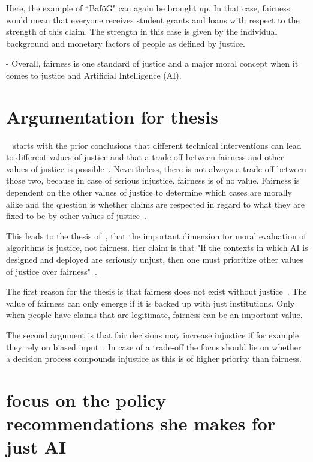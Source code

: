 Here, the example of ``BaföG" can again be brought up.
In that case, fairness would mean that everyone receives student grants and loans with respect to the strength of this claim.
The strength in this case is given by the individual background and monetary factors of people as defined by justice.

- Overall, fairness is one standard of justice and a major moral concept when it comes to justice and Artificial Intelligence (AI).~\parencite[][11, 13]{vredenburgh}

\section*{Argumentation for thesis}

~\cite{vredenburgh} starts with the prior conclusions that different technical interventions can lead to different values of justice and that a trade-off between fairness and other values of justice is possible~\parencite[][18]{vredenburgh}.
Nevertheless, there is not always a trade-off between those two, because in case of serious injustice, fairness is of no value.
Fairness is dependent on the other values of justice to determine which cases are morally alike and the question is whether claims are respected in regard to what they are fixed to be by other values of justice~\parencite[][18, 19]{vredenburgh}.

This leads to the thesis of~\cite{vredenburgh}, that the important dimension for moral evaluation of algorithms is justice, not fairness.
Her claim is that "If the contexts in which AI is designed and deployed are seriously unjust, then one must prioritize other values of justice over fairness"~\parencite[][19]{vredenburgh}.

The first reason for the thesis is that fairness does not exist without justice~\parencite[][19]{vredenburgh}.
The value of fairness can only emerge if it is backed up with just institutions.
Only when people have claims that are legitimate, fairness can be an important value.

The second argument is that fair decisions may increase injustice if for example they rely on biased input~\parencite[][19]{vredenburgh}.
In case of a trade-off the focus should lie on whether a decision process compounds injustice as this is of higher priority than fairness.

\section*{focus on the policy recommendations she makes for just AI}

